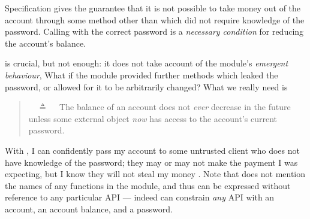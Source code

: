 Specification \SrobustA gives   the guarantee that it is not possible to  take money out of the account through some method other than  which did not
 require knowledge of the password.
  Calling   with the  correct password is 
a \emph{necessary condition} for reducing the account's  balance.

\SrobustA is  crucial, but  not   enough:
it does not take  account of the module's \emph{emergent behaviour},
 What if the module provided further methods which leaked the password,  
 {or allowed for it to be arbitrarily changed}?
{What} we really need is
 \begin{quote}
\SrobustB\ \ $\triangleq$ \ \ The balance of an account does not {\emph{ever}} decrease in the future unless some external 
object  {\emph{now}} has access to the account's current password.
\end{quote}
With \SrobustB, I can confidently pass my account to some untrusted client who
 does not have
 knowledge of the password; they may or may not make the payment I was expecting, but I
 know they will not  steal my money \cite{ooToSecurity,miller-esop2013}.
 Note that \SrobustB  does not mention
 the names of any functions in the module, and 
 thus can be expressed without reference to any particular API ---
 indeed \SrobustB can constrain \emph{any} API with an account, an account
 balance, and a password.
 
 
 

